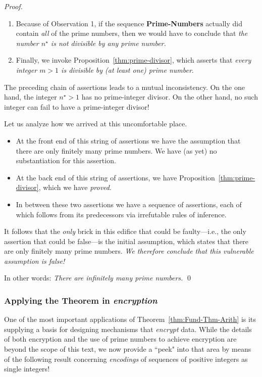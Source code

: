 \begin{proof}
\begin{enumerate}
\medskip\item
Because of Observation 1, if the sequence {\bf Prime-Numbers} actually did contain {\em all} of the prime numbers, then we would have to conclude that {\em the number $n^\star$ is not divisible by any prime number.}

\medskip\item
Finally, we invoke Proposition~\ref{thm:prime-divisor}, which asserts that {\em every integer $m >1$ is divisible by (at least one) prime number}.
\end{enumerate}
The preceding chain of assertions leads to a mutual inconsistency.  On the one hand, the integer $n^\star >1$ has no prime-integer divisor. On the other hand, no such integer can fail to have a prime-integer divisor!

\medskip

Let us analyze how we arrived at this uncomfortable place.
\begin{itemize}
\item
At the front end of this string of assertions we have the assumption that there are only finitely many prime numbers.  We have (as yet) no substantiation for this assertion.
\medskip\item
At the back end of this string of assertions, we have Proposition~\ref{thm:prime-divisor}, which we have {\em proved}.

\medskip\item
In between these two assertions we have a sequence of assertions, each of which follows from its predecessors via irrefutable rules of inference.
\end{itemize}
It follows that the {\em only} brick in this edifice that could be faulty---i.e., the only assertion that could be false---is the initial assumption, which states that there are only finitely many prime
numbers.  {\em We therefore conclude that this vulnerable assumption is false!} 

\smallskip

In other words: {\em There are infinitely many prime numbers.}  \qed
\end{proof}


\subsubsection{Applying the Theorem in {\em encryption}}
\label{sec:apply-FTA}

One of the most important applications of Theorem~\ref{thm:Fund-Thm-Arith} is its supplying a basis for designing mechanisms that {\em encrypt} data.  While the details of both encryption and the use of prime numbers to achieve encryption are beyond the scope of this text, we now provide a ``peek" into that area by means of the following result concerning {\it encodings} of sequences of positive integers as single integers!

